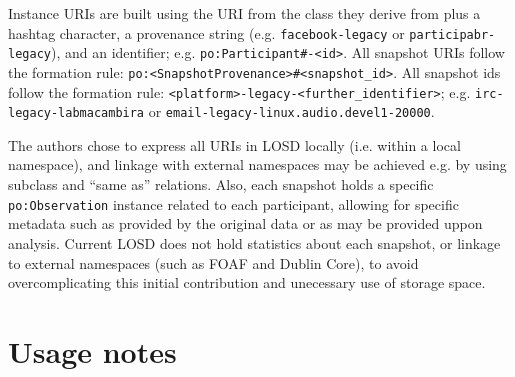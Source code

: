 \documentclass[data,datadescriptor,submit,moreauthors,pdftex]{Definitions/mdpi}
\newcommand{\te}[1] {\texttt{\footnotesize#1}}
\begin{document}
Instance URIs are built using the URI from the class they derive from plus a hashtag character,
a provenance string (e.g. \te{facebook-legacy} or
\te{participabr-legacy}), and an identifier;
e.g. \te{po:Participant\#<provenance-legacy>-<id>}.
All snapshot URIs follow the formation rule: \te{po:<SnapshotProvenance>\#<snapshot\_id>}.
All snapshot ids follow the formation rule: \te{<platform>-legacy-<further\_identifier>}; e.g.
\te{irc-legacy-labmacambira} or
\te{email-legacy-linux.audio.devel1-20000}.

The authors chose to express all URIs in LOSD locally (i.e. within a local namespace), and linkage with external namespaces may be achieved e.g. by using subclass and ``same as'' relations.
Also, each snapshot holds a specific \te{po:Observation} instance related to each participant,
allowing for specific metadata such as provided by the original data or as may be provided uppon analysis.
Current LOSD does not hold statistics about each snapshot, or linkage to external namespaces (such as FOAF and Dublin Core),
to avoid overcomplicating this initial contribution and unecessary use of storage space.

\section{Usage notes}\label{usage}
\end{document}
